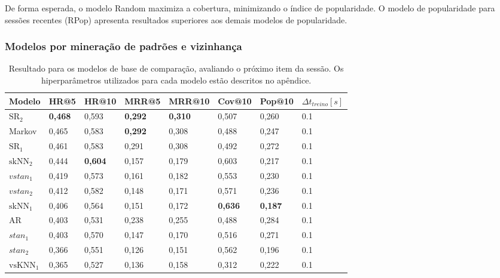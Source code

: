 De forma esperada, o modelo Random maximiza a cobertura, minimizando o índice de
popularidade. O modelo de popularidade para sessões recentes (RPop) apresenta
resultados superiores aos demais modelos de popularidade.


\subsubsection{Modelos por mineração de padrões e vizinhança}

\begin{table}[htbp]
  \centering
  \begin{tabular}{|l|l|l|l|l|l|l|l|}
    \hline
    Modelo & HR@5 & HR@10 & MRR@5 & MRR@10 & Cov@10 & Pop@10 & $\Delta t_{treino} [s]$ \\
    \hline
    $\text{SR}_{2}$ & \textbf{0,468} & 0,593 & \textbf{0,292} & \textbf{0,310} & 0,507 & 0,260 & 0.1 \\
    \hline
    Markov  & 0,465 & 0,583 & \textbf{0,292} & 0,308 & 0,488 & 0,247 & 0.1 \\
    \hline
    $\text{SR}_{1}$ & 0,461 & 0,583 & 0,291 & 0,308 & 0,492 & 0,272 & 0.1 \\
    \hline
    $\text{skNN}_{2}$ & 0,444 & \textbf{0,604} & 0,157 & 0,179 & 0,603 & 0,217 & 0.1 \\
    \hline
    $vstan_{1}$ & 0,419 & 0,573 & 0,161 & 0,182 & 0,553 & 0,230 & 0.1 \\
    \hline
    $vstan_{2}$ & 0,412 & 0,582 & 0,148 & 0,171 & 0,571 & 0,236 & 0.1 \\
    \hline
    $\text{skNN}_{1}$ & 0,406 & 0,564 & 0,151 & 0,172 & \textbf{0,636} & \textbf{0,187} & 0.1 \\
    \hline
    AR & 0,403 & 0,531 & 0,238 & 0,255 & 0,488 & 0,284 & 0.1 \\
    \hline
    $stan_{1}$ & 0,403 & 0,570 & 0,147 & 0,170 & 0,516 & 0,271 & 0.1 \\
    \hline
    $stan_{2}$ & 0,366 & 0,551 & 0,126 & 0,151 & 0,562 & 0,196 & 0.1 \\
    \hline
$\text{vsKNN}_{1}$ & 0,365 & 0,527 & 0,136 & 0,158 & 0,312 & 0,222 & 0.1 \\
    \hline
      \end{tabular}
  \caption{Resultado para os modelos de base de comparação, avaliando o próximo item da sessão.
  Os hiperparâmetros utilizados para cada modelo estão descritos no apêndice.}

\end{table}
